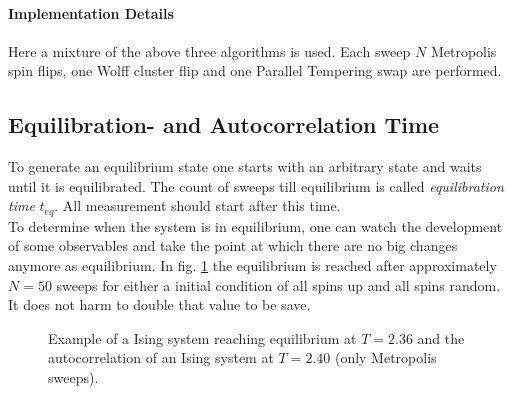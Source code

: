     \paragraph{Implementation Details}
        Here a mixture of the above three algorithms is used.
        Each sweep \(N\) Metropolis spin flips, one Wolff cluster flip
        and one Parallel Tempering swap are performed.

\subsection{Equilibration- and Autocorrelation Time}
    To generate an equilibrium state one starts with an arbitrary state
    and waits until it is equilibrated. The count of sweeps till
    equilibrium is called \emph{equilibration time} \(t_{eq}\).
    All measurement should start after this time.\\
    To determine when the system is in equilibrium, one can watch the
    development of some observables and take the point at which there
    are no big changes anymore as equilibrium. In fig.
    \ref{fig:equiandauto}
    the equilibrium is reached after approximately \(N=50\) sweeps for
    either a initial condition of all spins up and all spins random. It
    does not harm to double that value to be save.
    \begin{figure}[htbp]
        \centering
        \caption[Examples for equilibration and autocorrelation]
                { Example of a Ising
                    system reaching equilibrium at \(T=2.36\) and
                  the
                    autocorrelation of an Ising system at \(T=2.40\)
                    (only Metropolis sweeps).
                }
        \label{fig:equiandauto}
    \end{figure}

